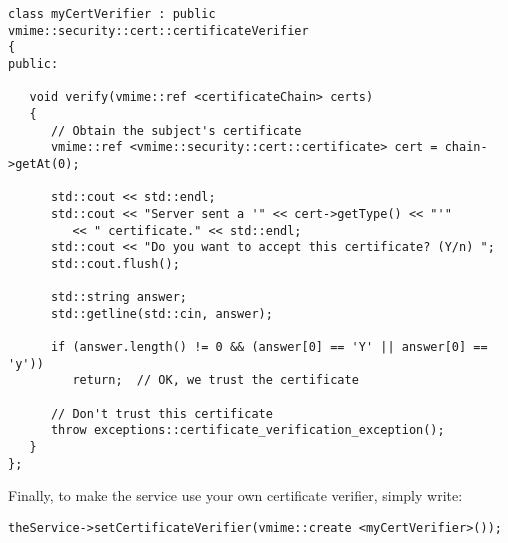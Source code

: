 \begin{lstlisting}[caption={A custom certificate verifier}]
class myCertVerifier : public vmime::security::cert::certificateVerifier
{
public:

   void verify(vmime::ref <certificateChain> certs)
   {
      // Obtain the subject's certificate
      vmime::ref <vmime::security::cert::certificate> cert = chain->getAt(0);

      std::cout << std::endl;
      std::cout << "Server sent a '" << cert->getType() << "'"
         << " certificate." << std::endl;
      std::cout << "Do you want to accept this certificate? (Y/n) ";
      std::cout.flush();

      std::string answer;
      std::getline(std::cin, answer);

      if (answer.length() != 0 && (answer[0] == 'Y' || answer[0] == 'y'))
         return;  // OK, we trust the certificate

      // Don't trust this certificate
      throw exceptions::certificate_verification_exception();
   }
};
\end{lstlisting}


Finally, to make the service use your own certificate verifier, simply write:

\begin{lstlisting}
theService->setCertificateVerifier(vmime::create <myCertVerifier>());
\end{lstlisting}

